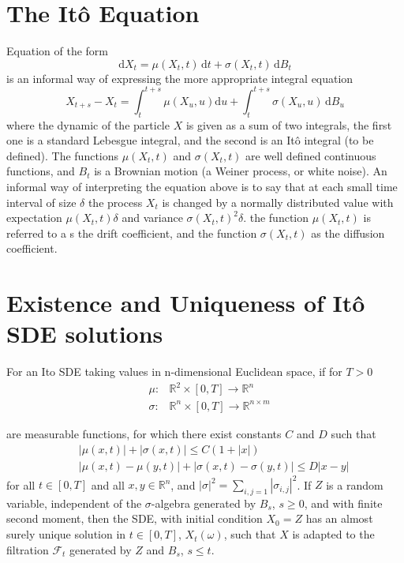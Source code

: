 \documentclass[12pt]{book}
\begin{document}
\section{The It\^{o} Equation}\label{section_theItoEquation}
Equation of the form 
\begin{equation*}
 \mathrm{d} X_t = \mu(X_t,t)\, \mathrm{d} t +  \sigma(X_t,t)\, \mathrm{d} B_t
\end{equation*}
is an informal way of expressing the more appropriate integral equation 
\begin{equation*}
X_{t+s} - X_{t} = \int_t^{t+s} \mu(X_u,u) \mathrm{d} u + \int_t^{t+s} \sigma(X_u,u)\, \mathrm{d} B_u
\end{equation*}
where the dynamic of the particle $X$ is given as a sum of two integrals, the first one is a standard Lebesgue integral, and the second is an It\^{o} integral (to be defined).  
The functions $\mu(X_t,t)$ and $\sigma(X_t,t)$ are well defined continuous functions, and $B_t$ is a Brownian motion (a Weiner process, or white noise). An informal way of interpreting the equation above is to say that at each small time interval of size $\delta$ the process $X_t$ is changed by a normally distributed value with expectation $\mu(X_t,t)\delta$ and variance $\sigma(X_t,t)^2\delta$. 
the function $\mu(X_t,t)$ is referred to a s the drift coefficient, and the function $\sigma(X_t,t)$ as the diffusion coefficient. 

\section{Existence and Uniqueness of It\^{o} SDE solutions}
For an Ito SDE taking values in n-dimensional Euclidean space, if for $T>0$\\
\begin{eqnarray*}
&\mu:   &\mathbb{R}^2\times[0,T]\rightarrow \mathbb{R}^n\\
&\sigma:&\mathbb{R}^n \times[0,T] \rightarrow \mathbb{R}^{n\times m}
\end{eqnarray*}

are measurable functions, for which there exist constants $C$ and $D$ such that 
\begin{eqnarray*}
& &|\mu(x,t)|+|\sigma(x,t)|\leq C(1+|x|)\\
& &|\mu(x,t)-\mu(y,t)|+|\sigma(x,t)-\sigma(y,t)|\leq D|x-y|
\end{eqnarray*}
for all $t\in [0,T]$ and all $x,y\in \mathbb{R}^n$, and $|\sigma|^2=\sum_{i,j=1}|\sigma_{i,j}|^2$. 
If $Z$ is a random variable, independent of the $\sigma$-algebra generated by $B_s$, $s\geq 0$, and with finite second moment, then the SDE, with initial condition $X_0=Z$ has an almost surely unique solution in $t\in[0,T]$, $X_t(\omega)$, such that $X$ is adapted to the filtration $\mathcal{F}_t$ generated by $Z$ and $B_s$, $s\leq t$.
\end{document}
